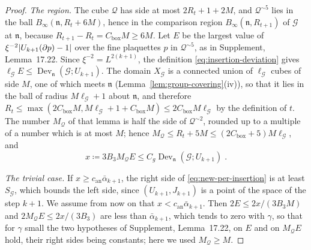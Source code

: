 \documentclass[11pt]{preprint}
\DeclarePairedDelimiter{\abs}{\lvert}{\rvert}
\numberwithin{equation}{section}
\theoremstyle{definition}
\theoremstyle{remark}
\theoremstyle{plain}
\begin{document}
\begin{proof}
\emph{The region.} The cube $\mathcal Q$ has side at most $2R_t + 1 + 2M$, and $\mathcal Q^{\sim 5}$ lies in the ball $B_\infty(\mathfrak n, R_t + 6M)$, hence in the comparison region $B_\infty(\mathfrak n, R_{t+1})$ of $\mathcal G$ at $\mathfrak n$, because $R_{t+1} - R_t = C_{\mathrm{box}}M \geq 6M$. Let $E$ be the largest value of $\xi^{-2}\abs{U_{k+1}(\partial p) - 1}$ over the fine plaquettes $p$ in $\mathcal Q^{\sim 5}$, as in Supplement, Lemma~17.22. Since $\xi^{-2} = L^{2(k+1)}$, the definition \eqref{eq:insertion-deviation} gives $\ell_{\mathcal G}E \leq \operatorname{Dev}_{\mathfrak n}(\mathcal G; U_{k+1})$. The domain $X_{\mathcal G}$ is a connected union of $\ell_{\mathcal G}$ cubes of side $M$, one of which meets $\mathfrak n$ (Lemma~\ref{lem:group-covering}(iv)), so that it lies in the ball of radius $M\ell_{\mathcal G} + 1$ about $\mathfrak n$, and therefore $R_t \leq \max(2C_{\mathrm{box}}M, M\ell_{\mathcal G} + 1 + C_{\mathrm{box}}M) \leq 2C_{\mathrm{box}}M\ell_{\mathcal G}$ by the definition of $t$. The number $M_{\mathcal Q}$ of that lemma is half the side of $\mathcal Q^{\sim 2}$, rounded up to a multiple of a number which is at most $M$; hence $M_{\mathcal Q} \leq R_t + 5M \leq (2C_{\mathrm{box}} + 5)M\ell_{\mathcal G}$, and
\begin{equation}\label{eq:local-field-size}
    x \coloneqq 3B_3M_{\mathcal Q}E \leq C_g\operatorname{Dev}_{\mathfrak n}(\mathcal G; U_{k+1})\;.
\end{equation}

\emph{The trivial case.} If $x \geq c_{\mathrm{an}}\bar\alpha_{k+1}$, the right side of \eqref{eq:new-per-insertion} is at least $S_{\mathcal G}$, which bounds the left side, since $(U_{k+1}, J_{k+1})$ is a point of the space of the step $k + 1$. We assume from now on that $x < c_{\mathrm{an}}\bar\alpha_{k+1}$. Then $2E \leq 2x/(3B_3M)$ and $2M_{\mathcal Q}E \leq 2x/(3B_3)$ are less than $\bar\alpha_{k+1}$, which tends to zero with $\gamma$, so that for $\gamma$ small the two hypotheses of Supplement, Lemma~17.22, on $E$ and on $M_{\mathcal Q}E$ hold, their right sides being constants; here we used $M_{\mathcal Q} \geq M$.


\end{proof}
\end{document}
